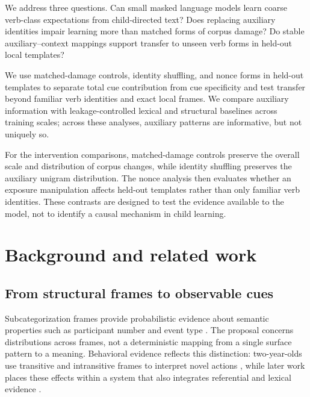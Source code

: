 \documentclass[11pt]{article}
\begin{document}
We address three questions. Can small masked language models learn coarse verb-class expectations from child-directed text? Does replacing auxiliary identities impair learning more than matched forms of corpus damage? Do stable auxiliary--context mappings support transfer to unseen verb forms in held-out local templates?

We use matched-damage controls, identity shuffling, and nonce forms in held-out templates to separate total cue contribution from cue specificity and test transfer beyond familiar verb identities and exact local frames. We compare auxiliary information with leakage-controlled lexical and structural baselines across training scales; across these analyses, auxiliary patterns are informative, but not uniquely so.

For the intervention comparisons, matched-damage controls preserve the overall scale and distribution of corpus changes, while identity shuffling preserves the auxiliary unigram distribution. The nonce analysis then evaluates whether an exposure manipulation affects held-out templates rather than only familiar verb identities. These contrasts are designed to test the evidence available to the model, not to identify a causal mechanism in child learning.
\section{Background and related work}

\subsection{From structural frames to observable cues}

Subcategorization frames provide probabilistic evidence about semantic properties such as participant number and event type \citep{gleitman1990,fisher1991}. The proposal concerns distributions across frames, not a deterministic mapping from a single surface pattern to a meaning. Behavioral evidence reflects this distinction: two-year-olds use transitive and intransitive frames to interpret novel actions \citep{naigles1990}, while later work places these effects within a system that also integrates referential and lexical evidence \citep{fisher2010}.
\end{document}
